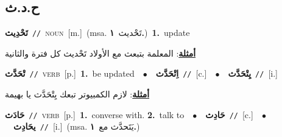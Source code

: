 \documentclass[10pt,a4paper,twoside]{article} %
\begin{document}
\begin{multicols}{2}
\vspace{-3mm}
\subsection*{\color{blue}\foreignlanguage{arabic}{ح.د.ث}\color{blue}{}} 

{\setlength\topsep{0pt}\textbf{\foreignlanguage{arabic}{تَحْدِيث}}\ {\color{gray}\texttt{//}\color{black}}\ \textsc{noun}\ [m.]\ \color{gray}(msa. \foreignlanguage{arabic}{تَحْديث}~\foreignlanguage{arabic}{\textbf{١.}})\color{black}\ \textbf{1.}~update\  \begin{flushright}\color{gray}\foreignlanguage{arabic}{\textbf{\underline{\foreignlanguage{arabic}{أمثلة}}}: المعلمة بتبعث مع الأولاد تَحْديث كل فترة والثانية}\end{flushright}\color{black}} \vspace{2mm}

{\setlength\topsep{0pt}\textbf{\foreignlanguage{arabic}{تْحَدَّث}}\ {\color{gray}\texttt{//}\color{black}}\ \textsc{verb}\ [p.]\ \textbf{1.}~be updated\ \ $\bullet$\ \ \setlength\topsep{0pt}\textbf{\foreignlanguage{arabic}{اِتْحَدَّث}}\ {\color{gray}\texttt{//}\color{black}}\ [c.]\ \ $\bullet$\ \ \setlength\topsep{0pt}\textbf{\foreignlanguage{arabic}{يِتْحَدَّث}}\ {\color{gray}\texttt{//}\color{black}}\ [i.]\  \begin{flushright}\color{gray}\foreignlanguage{arabic}{\textbf{\underline{\foreignlanguage{arabic}{أمثلة}}}: لازم الكمبيوتر تبعك يِتْحَدَّث يا بهيمة}\end{flushright}\color{black}} \vspace{2mm}

{\setlength\topsep{0pt}\textbf{\foreignlanguage{arabic}{حَادَث}}\ {\color{gray}\texttt{//}\color{black}}\ \textsc{verb}\ [p.]\ \textbf{1.}~converse with.  \textbf{2.}~talk to\ \ $\bullet$\ \ \setlength\topsep{0pt}\textbf{\foreignlanguage{arabic}{حَادِث}}\ {\color{gray}\texttt{//}\color{black}}\ [c.]\ \ $\bullet$\ \ \setlength\topsep{0pt}\textbf{\foreignlanguage{arabic}{يحَادِث}}\ {\color{gray}\texttt{//}\color{black}}\ [i.]\ \color{gray}(msa. \foreignlanguage{arabic}{يَتَحدَّث مع}~\foreignlanguage{arabic}{\textbf{١.}})\color{black}\ } \vspace{2mm}


\end{multicols}
\end{document}
